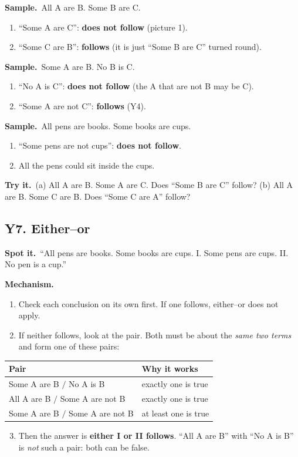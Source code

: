 \documentclass[11pt,a4paper]{article}
\let\oldsubsection\subsection
\renewcommand{\subsection}{\needspace{9\baselineskip}\oldsubsection}
\newcommand{\spot}{\textbf{\color{ember}Spot it.}\ }
\newcommand{\mech}{\textbf{\color{ember}Mechanism.}\ }
\newif\ifkeepsamp
\newcommand{\samp}{\ifkeepsamp\needspace{4\baselineskip}\fi\textbf{\color{ember}Sample.}\ }
\newcommand{\tryit}[1]{\textbf{\color{ember}Try it.}\ #1}
\begin{document}
\samp All A are B. Some B are C.
\begin{enumerate}
\item ``Some A are C'': \textbf{does not follow} (picture 1).
\item ``Some C are B'': \textbf{follows} (it is just ``Some B are C'' turned round).
\end{enumerate}
\samp Some A are B. No B is C.
\begin{enumerate}
\item ``No A is C'': \textbf{does not follow} (the A that are not B may be C).
\item ``Some A are not C'': \textbf{follows} (Y4).
\end{enumerate}
\samp All pens are books. Some books are cups.
\begin{enumerate}
\item ``Some pens are not cups'': \textbf{does not follow}.
\item All the pens could sit inside the cups.
\end{enumerate}

\tryit (a) All A are B. Some A are C. Does ``Some B are C'' follow? (b) All A are B. Some C are B. Does ``Some C are A'' follow?

\subsection{Y7. Either--or}
\spot ``All pens are books. Some books are cups. I. Some pens are cups. II. No pen is a cup.''

\mech
\begin{enumerate}
\item Check each conclusion on its own first. If one follows, either--or does not apply.
\item If neither follows, look at the pair. Both must be about the \emph{same two terms} and form one of these pairs:
\end{enumerate}
\begin{center}\small\renewcommand{\arraystretch}{1.18}\setlength{\tabcolsep}{9pt}
\begin{tabular}{@{}ll@{}}
\toprule
\textbf{\color{slate}Pair} & \textbf{\color{slate}Why it works} \\ \midrule
Some A are B $/$ No A is B & exactly one is true \\
All A are B $/$ Some A are not B & exactly one is true \\
Some A are B $/$ Some A are not B & at least one is true \\
\bottomrule
\end{tabular}\end{center}
\begin{enumerate}
\setcounter{enumi}{2}
\item Then the answer is \textbf{either I or II follows}. ``All A are B'' with ``No A is B'' is \emph{not} such a pair: both can be false.
\end{enumerate}
\end{document}
